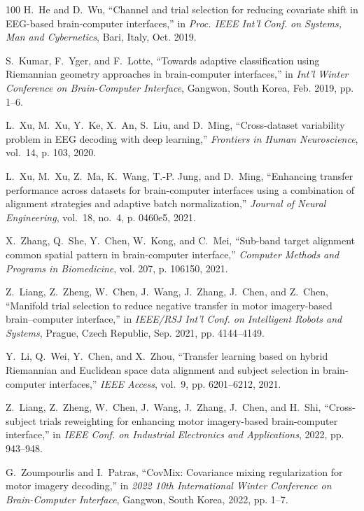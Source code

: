\documentclass[journal]{IEEEtran}
\begin{document}
\begin{thebibliography}{100}
H.~He and D.~Wu, ``Channel and trial selection for reducing covariate shift in
  {EEG}-based brain-computer interfaces,'' in \emph{Proc. {IEEE} Int'l Conf. on
  Systems, Man and Cybernetics}, Bari, Italy, Oct. 2019.

S.~Kumar, F.~Yger, and F.~Lotte, ``Towards adaptive classification using
  {Riemannian} geometry approaches in brain-computer interfaces,'' in
  \emph{Int'l Winter Conference on Brain-Computer Interface}, Gangwon, South
  Korea, Feb. 2019, pp. 1--6.

L.~Xu, M.~Xu, Y.~Ke, X.~An, S.~Liu, and D.~Ming, ``Cross-dataset variability
  problem in {EEG} decoding with deep learning,'' \emph{Frontiers in Human
  Neuroscience}, vol.~14, p. 103, 2020.

L.~Xu, M.~Xu, Z.~Ma, K.~Wang, T.-P. Jung, and D.~Ming, ``Enhancing transfer
  performance across datasets for brain-computer interfaces using a combination
  of alignment strategies and adaptive batch normalization,'' \emph{Journal of
  Neural Engineering}, vol.~18, no.~4, p. 0460e5, 2021.

X.~Zhang, Q.~She, Y.~Chen, W.~Kong, and C.~Mei, ``Sub-band target alignment
  common spatial pattern in brain-computer interface,'' \emph{Computer Methods
  and Programs in Biomedicine}, vol. 207, p. 106150, 2021.

Z.~Liang, Z.~Zheng, W.~Chen, J.~Wang, J.~Zhang, J.~Chen, and Z.~Chen,
  ``Manifold trial selection to reduce negative transfer in motor imagery-based
  brain--computer interface,'' in \emph{IEEE/RSJ Int'l Conf. on Intelligent
  Robots and Systems}, Prague, Czech Republic, Sep. 2021, pp. 4144--4149.

Y.~Li, Q.~Wei, Y.~Chen, and X.~Zhou, ``Transfer learning based on hybrid
  {R}iemannian and {E}uclidean space data alignment and subject selection in
  brain-computer interfaces,'' \emph{IEEE Access}, vol.~9, pp. 6201--6212,
  2021.

Z.~Liang, Z.~Zheng, W.~Chen, J.~Wang, J.~Zhang, J.~Chen, and H.~Shi,
  ``Cross-subject trials reweighting for enhancing motor imagery-based
  brain-computer interface,'' in \emph{IEEE Conf. on Industrial Electronics and
  Applications}, 2022, pp. 943--948.

G.~Zoumpourlis and I.~Patras, ``{CovMix}: Covariance mixing regularization for
  motor imagery decoding,'' in \emph{2022 10th International Winter Conference
  on Brain-Computer Interface}, Gangwon, South Korea, 2022, pp. 1--7.


\end{thebibliography}
\end{document}
